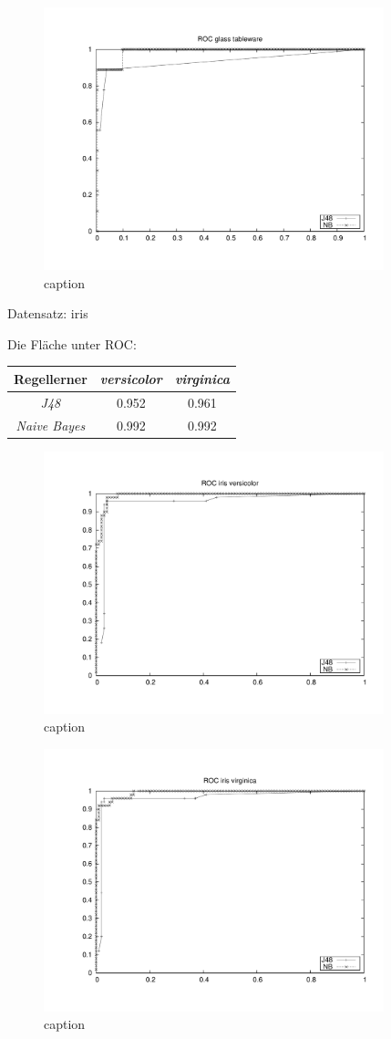 \begin{figure}[htbp]
	\centering
		\includegraphics[height=3in]{pics/a3/ROC_glass_tableware.pdf}
	\caption{caption}
	\label{fig:pics_a3_ROC_glass_tableware}
\end{figure}


Datensatz: iris

Die Fläche unter ROC:


\begin{tabular}{c|c|c}
				Regellerner       & \emph{versicolor} & \emph{virginica}  \\ \hline
				\emph{J48}			& 0.952 & 0.961  \\ \hline
				\emph{Naive Bayes}  & 0.992 & 0.992  
\end{tabular}

\begin{figure}[htbp]
	\centering
		\includegraphics[height=3in]{pics/a3/ROC_iris_versi.pdf}
	\caption{caption}
	\label{fig:pics_a3_ROC_iris_versi}
\end{figure}


\begin{figure}[htbp]
	\centering
		\includegraphics[height=3in]{pics/a3/ROC_iris_virgi.pdf}
	\caption{caption}
	\label{fig:pics_a3_ROC_iris_virgi}
\end{figure}

